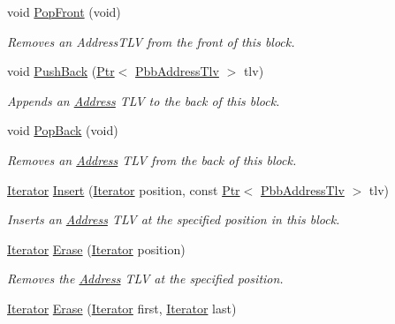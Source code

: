 \begin{DoxyCompactItemize}
void \hyperlink{classns3_1_1PbbAddressTlvBlock_a98f2b831ee64b017252a5f6320942429}{Pop\+Front} (void)
\begin{DoxyCompactList}\small\item\em Removes an Address\+T\+LV from the front of this block. \end{DoxyCompactList}\item 
void \hyperlink{classns3_1_1PbbAddressTlvBlock_a2789e1d2e5b701ad2fd7c9058eedc9ae}{Push\+Back} (\hyperlink{classns3_1_1Ptr}{Ptr}$<$ \hyperlink{classns3_1_1PbbAddressTlv}{Pbb\+Address\+Tlv} $>$ tlv)
\begin{DoxyCompactList}\small\item\em Appends an \hyperlink{classns3_1_1Address}{Address} T\+LV to the back of this block. \end{DoxyCompactList}\item 
void \hyperlink{classns3_1_1PbbAddressTlvBlock_a8c0104e3b1eb200cf7a6d210151743ca}{Pop\+Back} (void)
\begin{DoxyCompactList}\small\item\em Removes an \hyperlink{classns3_1_1Address}{Address} T\+LV from the back of this block. \end{DoxyCompactList}\item 
\hyperlink{classns3_1_1PbbAddressTlvBlock_a3291c01bdaccabd163f5b65b64c981da}{Iterator} \hyperlink{classns3_1_1PbbAddressTlvBlock_ae6ca54d382fc02d14f8ee8c443c6c29f}{Insert} (\hyperlink{classns3_1_1PbbAddressTlvBlock_a3291c01bdaccabd163f5b65b64c981da}{Iterator} position, const \hyperlink{classns3_1_1Ptr}{Ptr}$<$ \hyperlink{classns3_1_1PbbAddressTlv}{Pbb\+Address\+Tlv} $>$ tlv)
\begin{DoxyCompactList}\small\item\em Inserts an \hyperlink{classns3_1_1Address}{Address} T\+LV at the specified position in this block. \end{DoxyCompactList}\item 
\hyperlink{classns3_1_1PbbAddressTlvBlock_a3291c01bdaccabd163f5b65b64c981da}{Iterator} \hyperlink{classns3_1_1PbbAddressTlvBlock_a3416e73484d57d74c8b9063998a7b58b}{Erase} (\hyperlink{classns3_1_1PbbAddressTlvBlock_a3291c01bdaccabd163f5b65b64c981da}{Iterator} position)
\begin{DoxyCompactList}\small\item\em Removes the \hyperlink{classns3_1_1Address}{Address} T\+LV at the specified position. \end{DoxyCompactList}\item 
\hyperlink{classns3_1_1PbbAddressTlvBlock_a3291c01bdaccabd163f5b65b64c981da}{Iterator} \hyperlink{classns3_1_1PbbAddressTlvBlock_acdb73db934dc2b76b93502d43e341fe7}{Erase} (\hyperlink{classns3_1_1PbbAddressTlvBlock_a3291c01bdaccabd163f5b65b64c981da}{Iterator} first, \hyperlink{classns3_1_1PbbAddressTlvBlock_a3291c01bdaccabd163f5b65b64c981da}{Iterator} last)

\end{DoxyCompactItemize}
